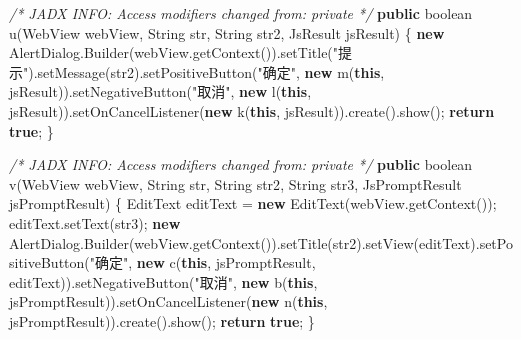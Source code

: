 \documentclass[
]{article}
\newenvironment{Shaded}{}{}
\newcommand{\BuiltInTok}[1]{\textcolor[rgb]{0.00,0.50,0.00}{#1}}
\newcommand{\CommentTok}[1]{\textcolor[rgb]{0.38,0.63,0.69}{\textit{#1}}}
\newcommand{\ControlFlowTok}[1]{\textcolor[rgb]{0.00,0.44,0.13}{\textbf{#1}}}
\newcommand{\DataTypeTok}[1]{\textcolor[rgb]{0.56,0.13,0.00}{#1}}
\newcommand{\FunctionTok}[1]{\textcolor[rgb]{0.02,0.16,0.49}{#1}}
\newcommand{\KeywordTok}[1]{\textcolor[rgb]{0.00,0.44,0.13}{\textbf{#1}}}
\newcommand{\NormalTok}[1]{#1}
\newcommand{\OperatorTok}[1]{\textcolor[rgb]{0.40,0.40,0.40}{#1}}
\newcommand{\StringTok}[1]{\textcolor[rgb]{0.25,0.44,0.63}{#1}}
\begin{document}
\begin{Shaded}
\begin{Highlighting}[]
    \CommentTok{/* JADX INFO: Access modifiers changed from: private */}
    \KeywordTok{public} \DataTypeTok{boolean} \FunctionTok{u}\OperatorTok{(}\NormalTok{WebView webView}\OperatorTok{,} \BuiltInTok{String}\NormalTok{ str}\OperatorTok{,} \BuiltInTok{String}\NormalTok{ str2}\OperatorTok{,}\NormalTok{ JsResult jsResult}\OperatorTok{)} \OperatorTok{\{}
        \KeywordTok{new}\NormalTok{ AlertDialog}\OperatorTok{.}\FunctionTok{Builder}\OperatorTok{(}\NormalTok{webView}\OperatorTok{.}\FunctionTok{getContext}\OperatorTok{()).}\FunctionTok{setTitle}\OperatorTok{(}\StringTok{"提示"}\OperatorTok{).}\FunctionTok{setMessage}\OperatorTok{(}\NormalTok{str2}\OperatorTok{).}\FunctionTok{setPositiveButton}\OperatorTok{(}\StringTok{"确定"}\OperatorTok{,} \KeywordTok{new} \FunctionTok{m}\OperatorTok{(}\KeywordTok{this}\OperatorTok{,}\NormalTok{ jsResult}\OperatorTok{)).}\FunctionTok{setNegativeButton}\OperatorTok{(}\StringTok{"取消"}\OperatorTok{,} \KeywordTok{new} \FunctionTok{l}\OperatorTok{(}\KeywordTok{this}\OperatorTok{,}\NormalTok{ jsResult}\OperatorTok{)).}\FunctionTok{setOnCancelListener}\OperatorTok{(}\KeywordTok{new} \FunctionTok{k}\OperatorTok{(}\KeywordTok{this}\OperatorTok{,}\NormalTok{ jsResult}\OperatorTok{)).}\FunctionTok{create}\OperatorTok{().}\FunctionTok{show}\OperatorTok{();}
        \ControlFlowTok{return} \KeywordTok{true}\OperatorTok{;}
    \OperatorTok{\}}

    \CommentTok{/* JADX INFO: Access modifiers changed from: private */}
    \KeywordTok{public} \DataTypeTok{boolean} \FunctionTok{v}\OperatorTok{(}\NormalTok{WebView webView}\OperatorTok{,} \BuiltInTok{String}\NormalTok{ str}\OperatorTok{,} \BuiltInTok{String}\NormalTok{ str2}\OperatorTok{,} \BuiltInTok{String}\NormalTok{ str3}\OperatorTok{,}\NormalTok{ JsPromptResult jsPromptResult}\OperatorTok{)} \OperatorTok{\{}
\NormalTok{        EditText editText }\OperatorTok{=} \KeywordTok{new} \FunctionTok{EditText}\OperatorTok{(}\NormalTok{webView}\OperatorTok{.}\FunctionTok{getContext}\OperatorTok{());}
\NormalTok{        editText}\OperatorTok{.}\FunctionTok{setText}\OperatorTok{(}\NormalTok{str3}\OperatorTok{);}
        \KeywordTok{new}\NormalTok{ AlertDialog}\OperatorTok{.}\FunctionTok{Builder}\OperatorTok{(}\NormalTok{webView}\OperatorTok{.}\FunctionTok{getContext}\OperatorTok{()).}\FunctionTok{setTitle}\OperatorTok{(}\NormalTok{str2}\OperatorTok{).}\FunctionTok{setView}\OperatorTok{(}\NormalTok{editText}\OperatorTok{).}\FunctionTok{setPositiveButton}\OperatorTok{(}\StringTok{"确定"}\OperatorTok{,} \KeywordTok{new} \FunctionTok{c}\OperatorTok{(}\KeywordTok{this}\OperatorTok{,}\NormalTok{ jsPromptResult}\OperatorTok{,}\NormalTok{ editText}\OperatorTok{)).}\FunctionTok{setNegativeButton}\OperatorTok{(}\StringTok{"取消"}\OperatorTok{,} \KeywordTok{new} \FunctionTok{b}\OperatorTok{(}\KeywordTok{this}\OperatorTok{,}\NormalTok{ jsPromptResult}\OperatorTok{)).}\FunctionTok{setOnCancelListener}\OperatorTok{(}\KeywordTok{new} \FunctionTok{n}\OperatorTok{(}\KeywordTok{this}\OperatorTok{,}\NormalTok{ jsPromptResult}\OperatorTok{)).}\FunctionTok{create}\OperatorTok{().}\FunctionTok{show}\OperatorTok{();}
        \ControlFlowTok{return} \KeywordTok{true}\OperatorTok{;}
    \OperatorTok{\}}


\end{Highlighting}
\end{Shaded}
\end{document}
